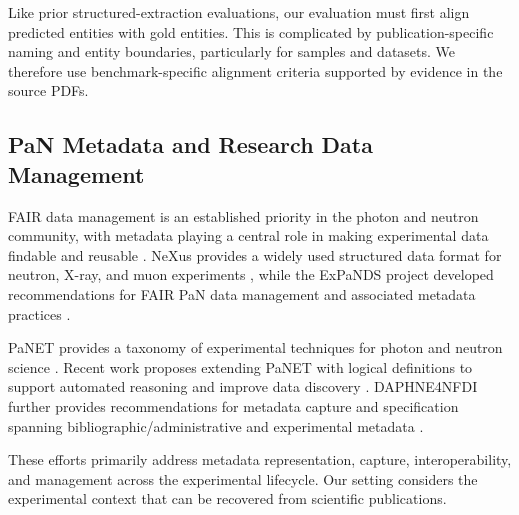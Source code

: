 Like prior structured-extraction evaluations, our evaluation must first align
predicted entities with gold entities. This is complicated by
publication-specific naming and entity boundaries, particularly for samples 
and datasets. We therefore use benchmark-specific alignment criteria
supported by evidence in the source PDFs.

\subsection{PaN Metadata and Research Data Management}

FAIR data management is an established priority in the photon and neutron
community, with metadata playing a central role in making experimental data
findable and reusable \citep{murphy2025fair}. NeXus provides
a widely used structured data format for neutron, X-ray, and muon experiments
\citep{konnecke2015nexus}, while the ExPaNDS project developed recommendations
for FAIR PaN data management and associated metadata practices
\citep{expands2022fair}.

PaNET provides a taxonomy of experimental techniques for photon and neutron
science \citep{collins2021panontologies}. Recent work proposes extending PaNET
with logical definitions to support automated reasoning and improve data
discovery \citep{tan2025panet}. DAPHNE4NFDI further provides recommendations
for metadata capture and specification spanning bibliographic/administrative and
experimental metadata \citep{lohstroh2025daphne}.

These efforts primarily address metadata representation, capture,
interoperability, and management across the experimental lifecycle. Our
setting considers the experimental context that can be recovered from scientific 
publications.
